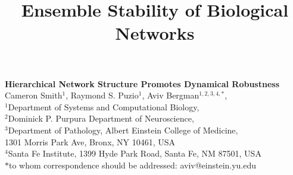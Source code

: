 



\let\ref\autoref


\title{Ensemble Stability of Biological Networks}

\begin{center}
{\Large
\textbf{Hierarchical Network Structure Promotes Dynamical Robustness}
}
\\[.5cm]
Cameron Smith$^{1}$,
Raymond S. Puzio$^{1}$,
Aviv Bergman$^{1,2,3,4,*}$,
\\[.5cm]
$^1$Department of Systems and Computational Biology,\\
$^2$Dominick P. Purpura Department of Neuroscience,\\
$^3$Department of Pathology, Albert Einstein College of Medicine,\\
1301 Morris Park Ave, Bronx, NY 10461, USA\\
$^4$Santa Fe Institute, 1399 Hyde Park Road, Santa Fe, NM 87501, USA
\\
$*$to whom correspondence should be addressed: aviv@einstein.yu.edu\\[.5cm]
\end{center}


